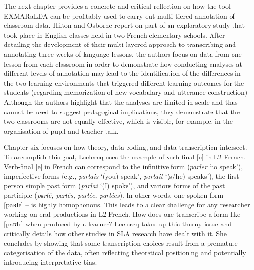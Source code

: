 \documentclass[output=paper]{../langscibook}
\begin{document}
The next chapter provides a concrete and critical reflection on how the tool EXMARaLDA can be profitably used to carry out multi-tiered annotation of classroom data. Hilton and Osborne report on part of an exploratory study that took place in English classes held in two French elementary schools. After detailing the development of their multi-layered approach to transcribing and annotating three weeks of language lessons, the authors focus on data from one lesson from each classroom in order to demonstrate how conducting analyses at different levels of annotation may lead to the identification of the differences in the two learning environments that triggered different learning outcomes for the students (regarding memorization of new vocabulary and utterance construction) Although the authors highlight that the analyses are limited in scale and thus cannot be used to suggest pedagogical implications, they demonstrate that the two classrooms are not equally effective, which is visible, for example, in the organisation of pupil and teacher talk.

Chapter six focuses on how theory, data coding, and data transcription intersect. To accomplish this goal, Leclercq uses the example of verb-final [e] in L2 French. Verb-final [e] in French can correspond to the infinitive form (\textit{parler} ‘to speak’), imperfective forms (e.g., \textit{parlais} ‘(you) speak’, \textit{parlait} ‘(s/he) speaks’), the first-person simple past form (\textit{parlai} ‘(I) spoke’), and various forms of the past participle (\textit{parlé, parlés, parlée, parlées}). In other words, one spoken form – [p{aʁle}] – is highly homophonous. This leads to a clear challenge for any researcher working on oral productions in L2 French. How does one transcribe a form like [p{aʁle}] when produced by a learner? Leclercq takes up this thorny issue and critically details how other studies in SLA research have dealt with it. She concludes by showing that some transcription choices result from a premature categorisation of the data, often reflecting theoretical positioning and potentially introducing interpretative bias.
\end{document}
